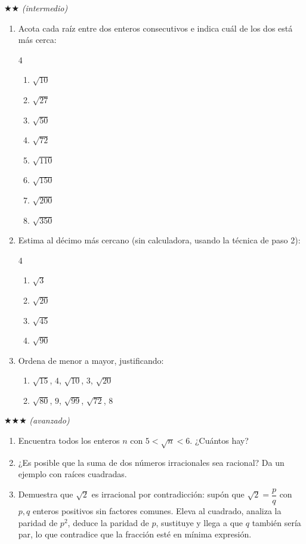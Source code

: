 \documentclass[11pt, letterpaper]{article}
\begin{document}
$\bigstar\bigstar$ \textit{(intermedio)}

\begin{enumerate}[label=\textbf{\arabic*.}, leftmargin=*, resume]
  \item Acota cada raíz entre dos enteros consecutivos e indica cuál de los dos está más cerca:
  \begin{multicols}{4}
  \begin{enumerate}[label=\alph*)]
    \item $\sqrt{10}$
    \item $\sqrt{27}$
    \item $\sqrt{50}$
    \item $\sqrt{72}$
    \item $\sqrt{110}$
    \item $\sqrt{150}$
    \item $\sqrt{200}$
    \item $\sqrt{350}$
  \end{enumerate}
  \end{multicols}

  \item Estima al décimo más cercano (sin calculadora, usando la técnica de paso 2):
  \begin{multicols}{4}
  \begin{enumerate}[label=\alph*)]
    \item $\sqrt{3}$
    \item $\sqrt{20}$
    \item $\sqrt{45}$
    \item $\sqrt{90}$
  \end{enumerate}
  \end{multicols}

  \item Ordena de menor a mayor, justificando:
  \begin{enumerate}[label=\alph*)]
    \item $\sqrt{15}$, $4$, $\sqrt{10}$, $3$, $\sqrt{20}$
    \item $\sqrt{80}$, $9$, $\sqrt{99}$, $\sqrt{72}$, $8$
  \end{enumerate}
\end{enumerate}

$\bigstar\bigstar\bigstar$ \textit{(avanzado)}

\begin{enumerate}[label=\textbf{\arabic*.}, leftmargin=*, resume]
  \item Encuentra todos los enteros $n$ con $5<\sqrt{n}<6$. ¿Cuántos hay?

  \item ¿Es posible que la suma de dos números irracionales sea racional? Da un ejemplo con raíces cuadradas.

  \item Demuestra que $\sqrt{2}$ es irracional por contradicción: supón que $\sqrt{2}=\dfrac{p}{q}$ con $p, q$ enteros positivos sin factores comunes. Eleva al cuadrado, analiza la paridad de $p^2$, deduce la paridad de $p$, sustituye y llega a que $q$ también sería par, lo que contradice que la fracción esté en mínima expresión.
\end{enumerate}
\end{document}
